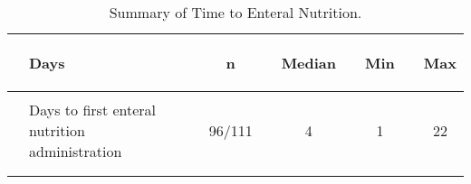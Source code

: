 \documentclass[dvips,10pt]{article}
\begin{document}
\begin{table}[t]
\caption
{ Summary of Time to Enteral Nutrition. }
\begin{center}
\begin{tabular}{ @{}l@{}
@{}l@{}@{}p{1.5em}@{}@{}c@{}@{}p{1.5em}@{}@{}c@{}@{}p{1.5em}@{}@{}c@{}@{}p{1.5em}@{}@{}c@{}
}
\hline

& \parbox{6em}{\begin{center}Days\end{center}} && \parbox{6em}{\begin{center}n\end{center}} && \parbox{6em}{\begin{center}Median\end{center}} && \parbox{6em}{\begin{center}Min\end{center}} && \parbox{6em}{\begin{center}Max\end{center}} \\

\hline

\\
& Days to first enteral nutrition administration && 96/111 && 4 && 1 && 22 \\
\\
\hline \\

\end{tabular}

\end{center}
 \end{table}
\clearpage
\end{document}
